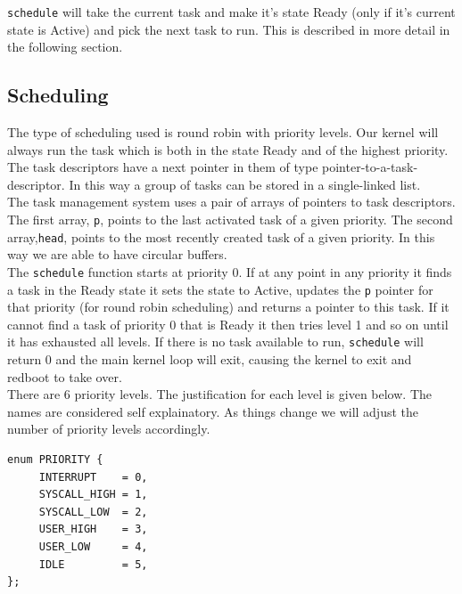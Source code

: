\documentclass{article}
\begin{document}
\texttt{schedule} will take the current task and make it's state {\sc Ready} 
(only if it's current state is {\sc Active}) and pick the next task to run. 
This is described in more detail in the following section.\\

\subsection{Scheduling}
The type of scheduling used is round robin with priority levels. Our kernel will 
always run the task which is both in the state {\sc Ready} and of the highest 
priority.\\

The task descriptors have a next pointer in them of type 
pointer-to-a-task-descriptor. In this way a group of tasks can be stored in a 
single-linked list.\\

The task management system uses a pair of arrays of pointers to task descriptors. 
The first array, \texttt{p}, points to the last activated task of a given priority. 
The second array,\texttt{head}, points to the most recently created task of a given 
priority. In this way we are able to have circular buffers.\\

The \texttt{schedule} function starts at priority 0. If at any point in any priority 
it finds a task in the {\sc Ready} state it sets the state to {\sc Active}, updates the 
\texttt{p} pointer for that priority (for round robin scheduling) and returns a pointer 
to this task. If it cannot find a task of priority 0 that is {\sc Ready} it then tries 
level 1 and so on until it has exhausted all levels. If there is no task available to 
run, \texttt{schedule} will return 0 and the main kernel loop will exit, causing the kernel 
to exit and redboot to take over.\\

There are 6 priority levels. The justification for each level is given below. The names 
are considered self explainatory. As things change we will adjust the number of priority 
levels accordingly.

\begin{verbatim}
enum PRIORITY {
     INTERRUPT    = 0,
     SYSCALL_HIGH = 1,
     SYSCALL_LOW  = 2,
     USER_HIGH    = 3,
     USER_LOW     = 4,
     IDLE         = 5,
};
\end{verbatim}
\end{document}
